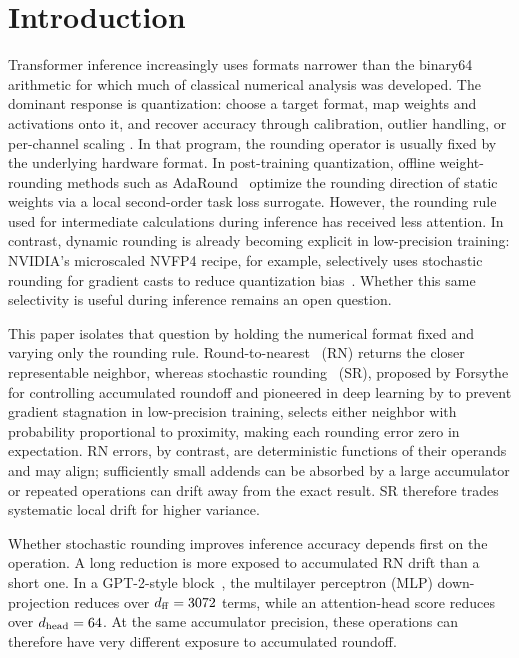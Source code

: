 \section{Introduction}
\label{sec:intro}

Transformer inference increasingly uses formats narrower than the binary64
arithmetic for which much of classical numerical analysis was developed. The
dominant response is quantization: choose a target format, map weights and
activations onto it, and recover accuracy through calibration, outlier handling,
or per-channel scaling
\citep{3600270.3602468,xiao2023smoothquant,lin2024awq,gong2024what}. In that
program, the rounding operator is usually fixed by the underlying hardware format.
In post-training quantization, offline weight-rounding methods such as
AdaRound~\citep{nagel2020adaround} optimize the rounding direction of static
weights via a local second-order task loss surrogate. However, the rounding
rule used for intermediate calculations during inference has received less
attention. In contrast, dynamic rounding is already becoming explicit in
low-precision training: NVIDIA's microscaled NVFP4 recipe,
for example, selectively uses stochastic rounding for gradient casts to reduce
quantization bias~\citep{nvidia2025nvfp4}. Whether this same
selectivity is useful during inference remains an open question.

This paper isolates that question by holding the numerical format fixed and
varying only the rounding rule. Round-to-nearest~\citep{muller2018handbook} (RN)
returns the closer representable neighbor, whereas stochastic
rounding~\citep{forsythe1959rounding,croci2022stochastic} (SR), proposed by
Forsythe for controlling accumulated roundoff and pioneered in deep learning by
\citet{gupta2015deep} to prevent gradient stagnation in low-precision training,
selects either neighbor with probability proportional to proximity, making each
rounding error zero in expectation.
RN errors, by contrast, are deterministic functions of their operands and may
align; sufficiently small addends can be absorbed by a large accumulator or
repeated operations can drift away from the exact result. SR therefore trades
systematic local drift for higher variance.

Whether stochastic rounding improves inference accuracy depends first on the
operation. A long reduction is more exposed to accumulated RN drift than a short
one. In a GPT-2-style block~\citep{radford2019language}, the multilayer
perceptron (MLP) down-projection reduces over $d_{\rm ff}=3072$ terms, while an
attention-head score reduces over $d_{\rm head}=64$. At the same accumulator
precision, these operations can therefore have very different exposure to
accumulated roundoff.

